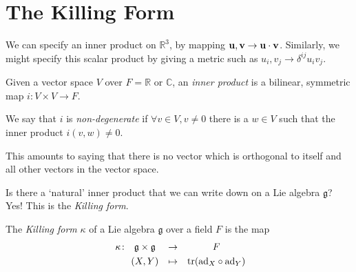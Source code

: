 \chapter{The Killing Form}%
\label{cha:the_killing_form}

We can specify an inner product on $\mathbb{R}^3$, by mapping $\vb{u}, \vb{v} \to \vb{u} \cdot \vb{v}$. 
Similarly, we might specify this scalar product by giving a metric such as $u_i, v_j \to \delta^{ij} u_i v_j$.

\begin{definition}
  Given a vector space $V$ over $F = \mathbb{R}$ or $\mathbb{C}$, an \emph{inner product} is a bilinear, symmetric map $i: V \times V \to F$.
\end{definition}

\begin{definition}[]
  We say that $i$ is \emph{non-degenerate} if $\forall v \in V, v \neq 0$ there is a $w \in V$ such that the inner product $i(v, w) \neq 0$.
\end{definition}
\begin{leftbar}
  \begin{remark}
    This amounts to saying that there is no vector which is orthogonal to itself and all other vectors in the vector space.
  \end{remark}
\end{leftbar}
Is there a `natural' inner product that we can write down on a Lie algebra $\mathfrak{g}$?
Yes! This is the \emph{Killing form}.
\begin{definition}[]
  The \emph{Killing form} $\kappa$ of a Lie algebra $\mathfrak{g}$ over a field $F$ is the map
  \begin{equation}
    \begin{gathered}
      \kappa \colon \\
      \qquad
    \end{gathered}
    \begin{gathered}
      \mathfrak{g} \times \mathfrak{g} \\
      (X, Y)
    \end{gathered}
    \quad
    \begin{gathered}
      \to \\
      \mapsto
    \end{gathered}
    \quad
    \begin{gathered}
      F \\
      \tr(\text{ad}_{X} \circ \text{ad} _{Y})
    \end{gathered}
  \end{equation}
\end{definition}
